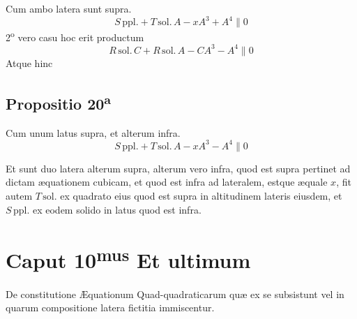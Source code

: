 \documentclass[11pt,a4paper]{article}
\begin{document}
Cum ambo latera sunt supra.
\[ S\,\mathrm{ppl.} + T\,\mathrm{sol.}\,A - x A^3 + A^4 \parallel 0 \]
2\textsuperscript{o} vero casu hoc erit productum
\[ R\,\mathrm{sol.}\,C + R\,\mathrm{sol.}\,A - C A^3 - A^4 \parallel 0 \]
Atque hinc

\subsection*{Propositio 20\textsuperscript{a}}

Cum unum latus supra, et alterum infra.
\[ S\,\mathrm{ppl.} + T\,\mathrm{sol.}\,A - x A^3 - A^4 \parallel 0 \]

Et sunt duo latera alterum supra, alterum vero infra, quod est supra pertinet ad dictam æquationem cubicam, et quod est infra ad lateralem, estque æquale $x$, fit autem $T\,\mathrm{sol.}$ ex quadrato eius quod est supra in altitudinem lateris eiusdem, et $S\,\mathrm{ppl.}$ ex eodem  solido in latus quod est infra.


\section*{Caput 10\textsuperscript{mus} Et ultimum}

De constitutione Æquationum Quad-quadraticarum quæ ex se subsistunt vel in quarum compositione latera fictitia immiscentur.
\end{document}
